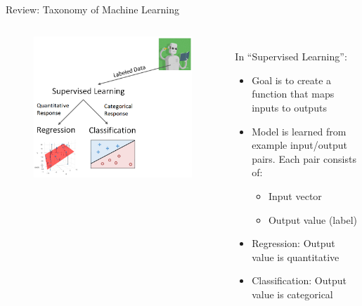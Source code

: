 \documentclass[aspectratio=169]{../latex_main/tntbeamer}  %
\begin{document}
	
	\begin{frame}{Review: Taxonomy of Machine Learning}
	    \begin{columns}
	        \begin{column}{.5\textwidth}
	                \begin{figure}
	                    \centering
	                    \includegraphics[scale=.33]{Bild2}
	                \end{figure}
	        \end{column}
	        
	        
	        \begin{column}{.5\textwidth}
	            \\
	            \bigskip In “Supervised Learning”:
	                \begin{itemize}
	                    \item Goal is to create a function that maps inputs to outputs
	                    \item Model is learned from example input/output pairs. Each pair consists of:
	                    \begin{itemize}
	                        \item Input vector
	                        \item Output value (label)
	                    \end{itemize}
	                    \item Regression: Output value is quantitative
	                    \item Classification: Output value is categorical
	                \end{itemize}
	        \end{column}
	    \end{columns}
	\end{frame}
	
\end{document}

